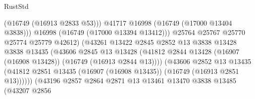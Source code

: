 \begin{lexlean}{RustStd}
\begin{coremodule}
                                                (@16749 (@16913 @2833 @53)))
                                              @41717
                                              @16998
                                              (@16749 (@17000 @13404 @3838)))
                                            @16998
                                            (@16749 (@17000 @13394 @13412)))
                                          @25764
                                          @25767
                                          @25770
                                          @25774
                                          @25779
                                          @42612)
                                        (@43261
                                          @13422
                                          @2845
                                          @2852
                                          @13
                                          @3838
                                          @13428
                                          @3838
                                          @13435
                                          (@43606
                                            @2845
                                            @13
                                            @13428
                                            (@41812
                                              @2844
                                              @13428
                                              (@16907 (@16908 @13428))
                                              (@16749 (@16913 @2844 @13))))
                                          (@43606
                                            @2852
                                            @13
                                            @13435
                                            (@41812
                                              @2851
                                              @13435
                                              (@16907 (@16908 @13435))
                                              (@16749 (@16913 @2851 @13))))))
                                      (@43196
                                        @2857
                                        @2864
                                        @2871
                                        @13
                                        @13461
                                        @13470
                                        @3838
                                        @13485
                                        (@43207
                                          @2856

\end{coremodule}
\end{lexlean}
